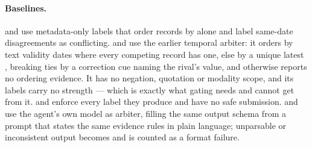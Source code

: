 \paragraph{Baselines.}  and  use metadata-only labels that order records by 
alone and label same-date disagreements as conflicting.  and  use the earlier temporal arbiter:
it orders by text validity dates where every competing record has one, else by a unique latest ,
breaking ties by a correction cue naming the rival's value, and otherwise reports no ordering evidence. It has no
negation, quotation or modality scope, and its labels carry no strength --- which is exactly what gating needs and
cannot get from it.  and  enforce every label they produce and have no safe submission.
 and  use the agent's own model as arbiter, filling the same output schema from a prompt that
states the same evidence rules in plain language; unparsable or inconsistent output becomes  and
is counted as a format failure.
